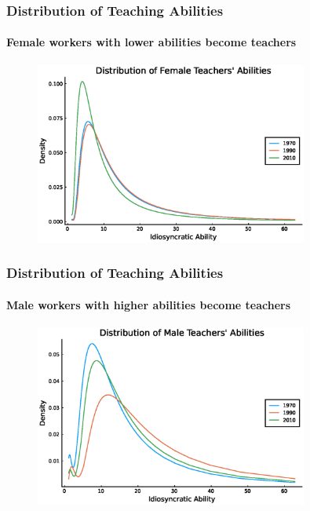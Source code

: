 \documentclass[11pt]{beamer}
\begin{document}
\begin{frame}
	\frametitle{Distribution of Teaching Abilities}
	\framesubtitle{Female workers with lower abilities become teachers}
	\begin{figure}
		\begin{center}
			\includegraphics[width=0.8\textwidth]{plots/fT_women_steadystate.eps}
			\label{ }
		\end{center}
	\end{figure}
\end{frame}

\begin{frame}
	\frametitle{Distribution of Teaching Abilities}
	\framesubtitle{Male workers with higher abilities become teachers}
	\begin{figure}
		\begin{center}
			\includegraphics[width=0.8\textwidth]{plots/fT_men_steadystate.eps}
			\label{ }
		\end{center}
	\end{figure}
\end{frame}

\end{document}
